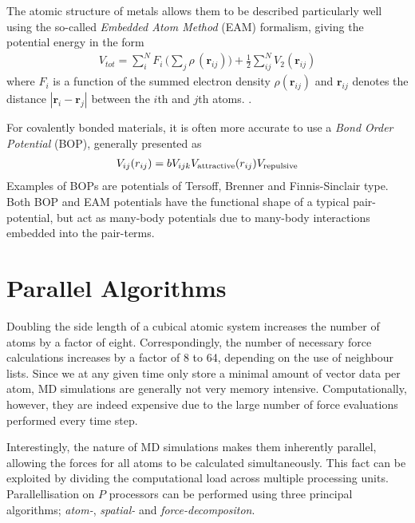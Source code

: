 The atomic structure of metals allows them to be described particularly well using the so-called \textit{Embedded Atom Method} (EAM) formalism, giving the potential energy in the form
\begin{align}
V_{tot} = \sum_i^N F_i\, \bigg( \sum_j \rho\, (\mathbf{r}_{ij}) \bigg) + \frac{1}{2} \sum^N_{ij} V_2 (\mathbf{r}_{ij})
\end{align}
where  $F_i$ is a function of the summed electron density $\rho (\mathbf{r}_{ij})$ and $\mathbf{r}_{ij}$ denotes the distance $| \mathbf{r}_i - \mathbf{r}_j |$ between the $i$th and $j$th atoms. \cite{EAMmodel,dudarevEAMpotential}. 

For covalently bonded materials, it is often more accurate to use a \textit{Bond Order Potential} (BOP), generally presented as
\begin{align}
V_{ij}(r_{ij}) =bV_{ijk}V_{\rm attractive}(r_{ij}) V_ {\rm repulsive}
\end{align}
Examples of BOPs are potentials of Tersoff, Brenner and Finnis-Sinclair type. \cite{tersoff1988new, brenner1990empirical, finnis1984simple} Both BOP and EAM potentials have the functional shape of a typical pair-potential, but act as many-body potentials due to many-body interactions embedded into the pair-terms.

\section{Parallel Algorithms}
Doubling the side length of a cubical atomic system increases the number of atoms by a factor of eight. 
Correspondingly, the number of necessary force calculations increases by a factor of  8 to 64, depending on the use of neighbour lists.
Since we at any given time only store a minimal amount of vector data per atom, MD simulations are generally not very memory intensive.
Computationally, however, they are indeed expensive due to the large number of force evaluations performed every time step.

Interestingly, the nature of MD simulations makes them inherently parallel, allowing the forces for all atoms to be calculated simultaneously. 
This fact can be exploited by dividing the computational load across multiple processing units. 
Parallellisation on $P$ processors can be performed using three principal algorithms; \textit{atom-}, \textit{spatial-} and \textit{force-decompositon}. 
\cite{fincham1987parallel}

